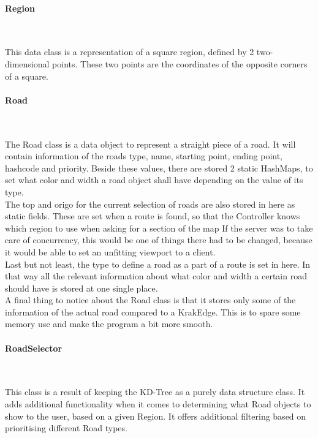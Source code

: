 \documentclass[a4paper,10pt,titlepage]{article}
\begin{document}
				\paragraph{Region}\mbox{}\
				
This data class is a representation of a square region, defined by 2 two-dimensional points. These two points are the coordinates of the opposite corners of a square.
				
				\paragraph{Road}\mbox{}\
				
The Road class is a data object to represent a straight piece of a road. It will contain information of the roads type, name, starting point, ending point, hashcode and priority. Beside these values, there are stored 2 static HashMaps, to set what color and width a road object shall have depending on the value of its type. \\
The top and origo for the current selection of roads are also stored in here as static fields. These are set when a route is found, so that the Controller knows which region to use when asking for a section of the map
If the server was to take care of concurrency, this would be one of things there had to be changed, because it would be able to set an unfitting viewport to a client.\\
Last but not least, the type to define a road as a part of a route is set in here. In that way all the relevant information about what color and width a certain road should have is stored at one single place.\\
A final thing to notice about the Road class is that it stores only some of the information of the actual road compared to a KrakEdge. This is to spare some memory use and make the program a bit more smooth.\\

				
				\paragraph{RoadSelector}\mbox{}\
				
This class is a result of keeping the KD-Tree as a purely data structure class. It adds additional functionality when it comes to determining what Road objects to show to the user, based on a given Region. It offers additional filtering based on prioritising different Road types.\\
\end{document}
